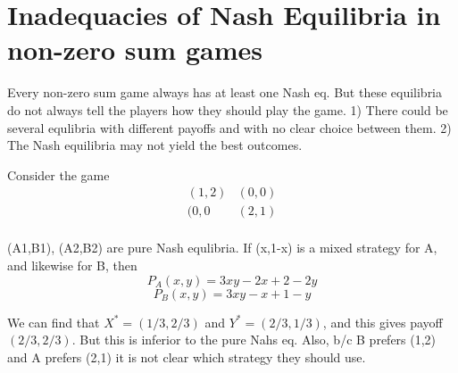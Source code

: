 \section{Inadequacies of Nash Equilibria in non-zero sum games}

Every non-zero sum game always has at least one Nash eq. But these equilibria do not always tell the players how they should play the game. 1) There could be several equlibria with different payoffs and with no clear choice between them. 2) The Nash equilibria may not yield the best outcomes.


Consider the game
\[\begin{matrix}
(1,2) & (0,0) \\
(0,0  & (2,1) \\
\end{matrix}\]

(A1,B1), (A2,B2) are pure Nash equlibria. If (x,1-x) is a mixed strategy for A, and likewise for B, then
\[P_A(x,y)=3xy-2x+2-2y\]
\[P_B(x,y)=3xy-x+1-y\]

We can find that $X^*=(1/3,2/3)$ and $Y^*=(2/3,1/3)$, and this gives payoff $(2/3,2/3)$. But this is inferior to the pure Nahs eq. Also, b/c B prefers (1,2) and A prefers (2,1) it is not clear which strategy they should use.





